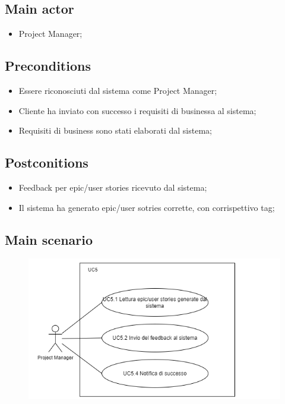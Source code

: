 \documentclass{article}
\begin{document}
    \subsection*{Main actor}
    \begin{itemize}
        \item Project Manager;
    \end{itemize}
    
    \subsection*{Preconditions}
        \begin{itemize}
            \item Essere riconosciuti dal sistema come Project Manager;
            \item Cliente ha inviato con successo i requisiti di businessa al sistema;
            \item Requisiti di business sono stati elaborati dal sistema;
        \end{itemize}
        
    \subsection*{Postconitions}
        \begin{itemize}
            \item Feedback per epic/user stories ricevuto dal sistema;
            \item Il sistema ha generato epic/user sotries corrette, con corrispettivo tag;
        \end{itemize}
        
    \subsection*{Main scenario}
        \begin{figure}[h]
          \centering
          \includegraphics{./imgUML/UC5-zoom-1.png}
          \label{fig:immagine}
        \end{figure}
\end{document}
